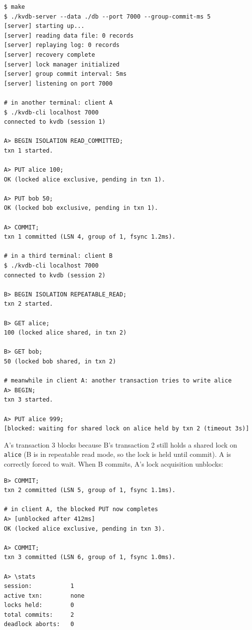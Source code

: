 \documentclass[11pt,a4paper]{article}
\begin{document}
\begin{codebox}
\begin{lstlisting}
$ make
$ ./kvdb-server --data ./db --port 7000 --group-commit-ms 5
[server] starting up...
[server] reading data file: 0 records
[server] replaying log: 0 records
[server] recovery complete
[server] lock manager initialized
[server] group commit interval: 5ms
[server] listening on port 7000

# in another terminal: client A
$ ./kvdb-cli localhost 7000
connected to kvdb (session 1)

A> BEGIN ISOLATION READ_COMMITTED;
txn 1 started.

A> PUT alice 100;
OK (locked alice exclusive, pending in txn 1).

A> PUT bob 50;
OK (locked bob exclusive, pending in txn 1).

A> COMMIT;
txn 1 committed (LSN 4, group of 1, fsync 1.2ms).

# in a third terminal: client B
$ ./kvdb-cli localhost 7000
connected to kvdb (session 2)

B> BEGIN ISOLATION REPEATABLE_READ;
txn 2 started.

B> GET alice;
100 (locked alice shared, in txn 2)

B> GET bob;
50 (locked bob shared, in txn 2)

# meanwhile in client A: another transaction tries to write alice
A> BEGIN;
txn 3 started.

A> PUT alice 999;
[blocked: waiting for shared lock on alice held by txn 2 (timeout 3s)]
\end{lstlisting}
\end{codebox}

A's transaction 3 blocks because B's transaction 2 still holds a shared lock on \texttt{alice} (B is in repeatable read mode, so the lock is held until commit). A is correctly forced to wait. When B commits, A's lock acquisition unblocks:

\begin{codebox}
\begin{lstlisting}
B> COMMIT;
txn 2 committed (LSN 5, group of 1, fsync 1.1ms).

# in client A, the blocked PUT now completes
A> [unblocked after 412ms]
OK (locked alice exclusive, pending in txn 3).

A> COMMIT;
txn 3 committed (LSN 6, group of 1, fsync 1.0ms).

A> \stats
session:           1
active txn:        none
locks held:        0
total commits:     2
deadlock aborts:   0
\end{lstlisting}
\end{codebox}
\end{document}
